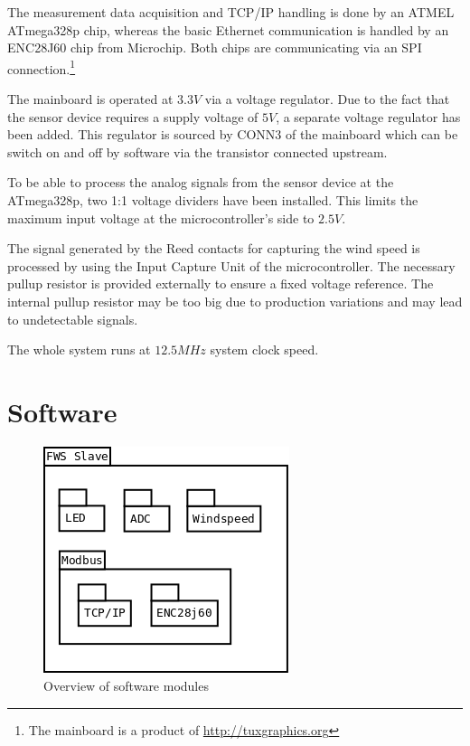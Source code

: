 The measurement data acquisition and TCP/IP handling is done by an ATMEL ATmega328p chip, whereas the basic Ethernet communication is handled by an ENC28J60 chip from Microchip. Both chips are communicating via an SPI connection.\footnote{The mainboard is a product of \url{http://tuxgraphics.org}} 

The mainboard is operated at $3.3 V$ via a voltage regulator. Due to the fact that the sensor device requires a supply voltage of $5 V$, a separate voltage regulator has been added. This regulator is sourced by CONN3 of the mainboard which can be switch on and off by software via the transistor connected upstream.

To be able to process the analog signals from the sensor device at the ATmega328p, two 1:1 voltage dividers have been installed. This limits the maximum input voltage at the microcontroller's side to $2.5 V$.

The signal generated by the Reed contacts for capturing the wind speed is processed by using the Input Capture Unit of the microcontroller. The necessary pullup resistor is provided externally to ensure a fixed voltage reference. The internal pullup resistor may be too big due to production variations and may lead to undetectable signals.

The whole system runs at $12.5 MHz$ system clock speed.

\section{Software}

\begin{figure}[H]
    \centering
    \includegraphics[width=0.6\linewidth]{graphics/fws_slave.png}
    \caption{Overview of software modules}
    \label{fig:slave_software}
\end{figure}

